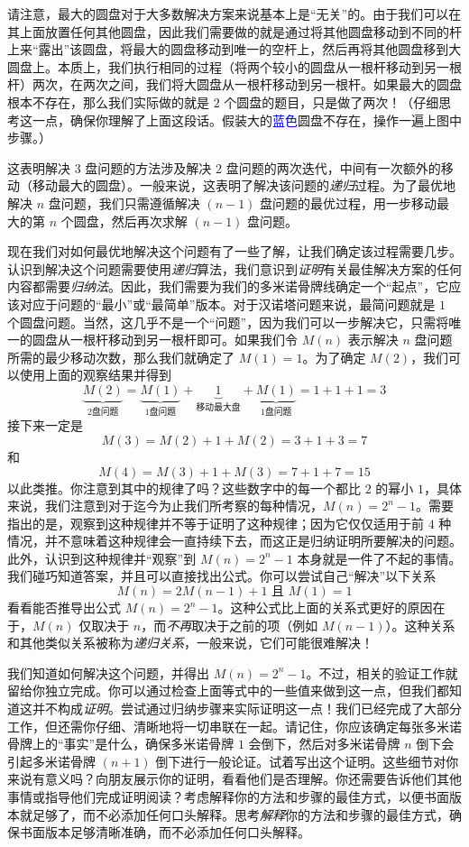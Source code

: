 请注意，最大的圆盘对于大多数解决方案来说基本上是“无关”的。由于我们可以在其上面放置任何其他圆盘，因此我们需要做的就是通过将其他圆盘移动到不同的杆上来“露出”该圆盘，将最大的圆盘移动到唯一的空杆上，然后再将其他圆盘移到大圆盘上。本质上，我们执行相同的过程（将两个较小的圆盘从一根杆移动到另一根杆）两次，在两次之间，我们将大圆盘从一根杆移动到另一根杆。如果最大的圆盘根本不存在，那么我们实际做的就是 $2$ 个圆盘的题目，只是做了两次！（仔细思考这一点，确保你理解了上面这段话。假装大的\textcolor{blue}{蓝色}圆盘不存在，操作一遍上图中步骤。）

这表明解决 $3$ 盘问题的方法涉及解决 $2$ 盘问题的两次迭代，中间有一次额外的移动（移动最大的圆盘）。一般来说，这表明了解决该问题的\textit{递归}过程。为了最优地解决 $n$ 盘问题，我们只需遵循解决 $(n - 1)$ 盘问题的最优过程，用一步移动最大的第 $n$ 个圆盘，然后再次求解 $(n - 1)$ 盘问题。

现在我们对如何最优地解决这个问题有了一些了解，让我们确定该过程需要几步。认识到解决这个问题需要使用\textit{递归}算法，我们意识到\textit{证明}有关最佳解决方案的任何内容都需要\textit{归纳法}。因此，我们需要为我们的多米诺骨牌线确定一个“起点”，它应该对应于问题的“最小”或“最简单”版本。对于汉诺塔问题来说，最简问题就是 $1$ 个圆盘问题。当然，这几乎不是一个“问题”，因为我们可以一步解决它，只需将唯一的圆盘从一根杆移动到另一根杆即可。如果我们令 $M(n)$ 表示解决 $n$ 盘问题所需的最少移动次数，那么我们就确定了 $M(1) = 1$。为了确定 $M(2)$，我们可以使用上面的观察结果并得到
\[\underbrace{M(2)}_{2 \text{盘问题}}= \underbrace{M(1)}_{1 \text{盘问题}}+ \underbrace{1}_{\text{移动最大盘}}+ \underbrace{M(1)}_{1 \text{盘问题}}= 1 + 1 + 1 = 3\]
接下来一定是
\[M(3) = M(2) + 1 + M(2) = 3 + 1 + 3 = 7\]
和
\[M(4) = M(3) + 1 + M(3) = 7 + 1 + 7 = 15\]
以此类推。你注意到其中的规律了吗？这些数字中的每一个都比 $2$ 的幂小 $1$，具体来说，我们注意到对于迄今为止我们所考察的每种情况，$M(n) = 2^n - 1$。需要指出的是，观察到这种规律并不等于证明了这种规律；因为它仅仅适用于前 $4$ 种情况，并不意味着这种规律会一直持续下去，而这正是归纳证明所要解决的问题。此外，认识到这种规律并“观察”到 $M(n) = 2^n - 1$ 本身就是一件了不起的事情。我们碰巧知道答案，并且可以直接找出公式。你可以尝试自己“解决”以下关系
\[M(n) = 2M(n - 1) + 1 \text{ 且 } M(1) = 1\]
看看能否推导出公式 $M(n) = 2^n -1$。这种公式比上面的关系式更好的原因在于，$M(n)$ 仅取决于 $n$，而\textit{不再}取决于之前的项（例如 $M(n-1)$）。这种关系和其他类似关系被称为\textit{递归关系}，一般来说，它们可能很难解决！

我们知道如何解决这个问题，并得出 $M(n) = 2^n - 1$。不过，相关的验证工作就留给你独立完成。你可以通过检查上面等式中的一些值来做到这一点，但我们都知道这并不构成\textit{证明}。尝试通过归纳步骤来实际证明这一点！我们已经完成了大部分工作，但还需你仔细、清晰地将一切串联在一起。请记住，你应该确定每张多米诺骨牌上的“事实”是什么，确保多米诺骨牌 $1$ 会倒下，然后对多米诺骨牌 $n$ 倒下会引起多米诺骨牌 $(n+1)$ 倒下进行一般论证。试着写出这个证明。这些细节对你来说有意义吗？向朋友展示你的证明，看看他们是否理解。你还需要告诉他们其他事情或指导他们完成证明阅读？考虑解释你的方法和步骤的最佳方式，以便书面版本就足够了，而不必添加任何口头解释。思考\textit{解释}你的方法和步骤的最佳方式，确保书面版本足够清晰准确，而不必添加任何口头解释。 

